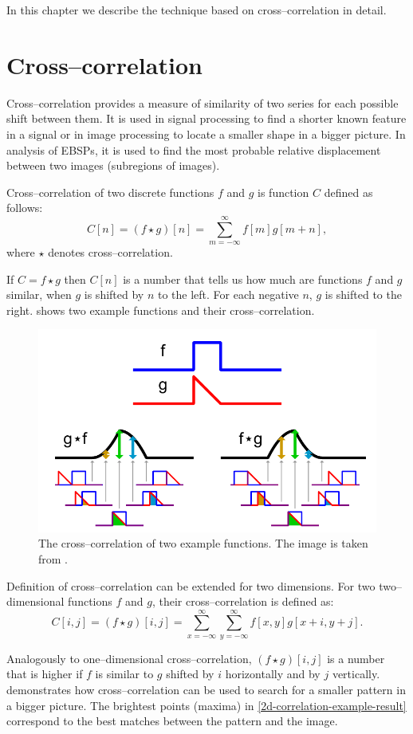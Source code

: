 In this chapter we describe the technique based on cross--correlation in detail.

\section{Cross--correlation}

Cross--correlation provides a measure of similarity of two series for each possible shift between them. It is used in signal processing to find a shorter known feature in a signal or in image processing to locate a smaller shape in a bigger picture. In analysis of EBSPs, it is used to find the most probable relative displacement between two images (subregions of images).

Cross--correlation of two discrete functions $f$ and $g$ is function $C$ defined as follows:
\[
C[n] = (f \star g)[n] = \sum_{m=-\infty}^{\infty}f[m]g[m+n],
\]
where $\star$ denotes cross--correlation.

If $C = f \star g$ then $C[n]$ is a number that tells us how much are functions $f$ and $g$ similar, when $g$ is shifted by $n$ to the left. For each negative $n$, $g$ is shifted to the right.  shows two example functions and their cross--correlation.

\begin{figure}
	\centering
	\includegraphics[width=0.7\linewidth]{img/correlation}
	\caption{The cross--correlation of two example functions. The image is taken from \cite{correlation_example}.}
	\label{correlation-example}
\end{figure}

Definition of cross--correlation can be extended for two dimensions. For two two--dimensional functions $f$ and $g$, their cross--correlation is defined as:
\[
C[i,j] = (f \star g)[i,j] = \sum_{x=-\infty}^{\infty}\sum_{y=-\infty}^{\infty}f[x,y]g[x+i,y+j].
\]

Analogously to one--dimensional cross--correlation, $(f \star g)[i,j]$ is a number that is higher if $f$ is similar to $g$ shifted by $i$ horizontally and by $j$ vertically.  demonstrates how cross--correlation can be used to search for a smaller pattern in a bigger picture. The brightest points (maxima) in \cref{2d-correlation-example-result} correspond to the best matches between the pattern and the image.

